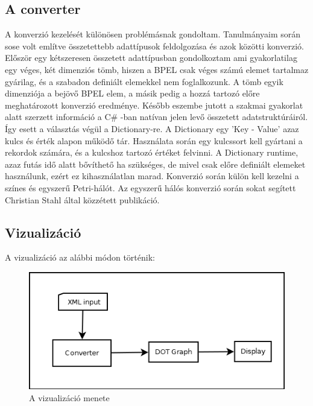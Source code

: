 \subsection{A converter }
A konverzió kezelését különösen problémásnak gondoltam. Tanulmányaim során sose volt említve összetettebb adattípusok feldolgozása és azok közötti konverzió. Először egy kétszeresen összetett adattípusban gondolkoztam ami gyakorlatilag egy véges, két dimenziós tömb, hiszen a BPEL csak véges számú elemet tartalmaz gyárilag, és a szabadon definiált elemekkel nem foglalkozunk. A tömb egyik dimenziója a bejövő BPEL elem, a másik pedig a hozzá tartozó előre meghatározott konverzió eredménye. Később eszembe jutott a szakmai gyakorlat alatt szerzett információ a C\# -ban natívan jelen levő összetett adatstruktúráiról. Így esett a választás végül a Dictionary-re. A Dictionary egy 'Key - Value' azaz kulcs és érték alapon működő tár. Használata során egy kulcssort kell gyártani a rekordok számára, és a kulcshoz tartozó értéket felvinni. A Dictionary runtime, azaz futás idő alatt bővíthető ha szükséges, de mivel csak előre definiált elemeket használunk, ezért ez kihasználatlan marad. Konverzió során külön kell kezelni a színes és egyszerű Petri-hálót. Az egyszerű hálós konverzió során sokat segített Christian Stahl által közzétett publikáció\cite{bpelToPnet}.

\subsection{Vizualizáció}
A vizualizáció az alábbi módon történik:
\begin{figure}[h!]
\centering
\includegraphics[scale=0.6]{images/graphdisplay.png}
\caption{A vizualizáció menete}
\label{fig:graphdisplay}
\end{figure}

